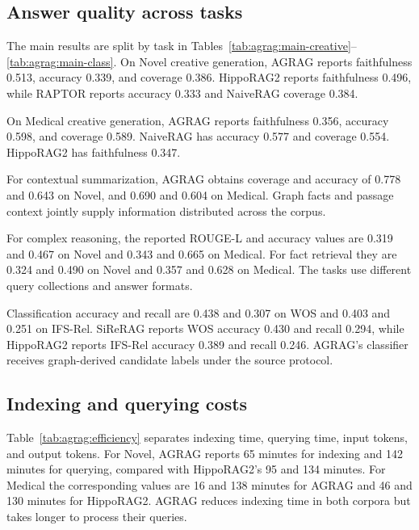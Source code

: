 





\subsection{Answer quality across tasks}
The main results are split by task in Tables~\ref{tab:agrag:main-creative}--\ref{tab:agrag:main-class}. On Novel creative generation, AGRAG reports faithfulness 0.513, accuracy 0.339, and coverage 0.386. HippoRAG2 reports faithfulness 0.496, while RAPTOR reports accuracy 0.333 and NaiveRAG coverage 0.384.

On Medical creative generation, AGRAG reports faithfulness 0.356, accuracy 0.598, and coverage 0.589. NaiveRAG has accuracy 0.577 and coverage 0.554. HippoRAG2 has faithfulness 0.347.

For contextual summarization, AGRAG obtains coverage and accuracy of 0.778 and 0.643 on Novel, and 0.690 and 0.604 on Medical. Graph facts and passage context jointly supply information distributed across the corpus.

For complex reasoning, the reported ROUGE-L and accuracy values are 0.319 and 0.467 on Novel and 0.343 and 0.665 on Medical. For fact retrieval they are 0.324 and 0.490 on Novel and 0.357 and 0.628 on Medical. The tasks use different query collections and answer formats.

Classification accuracy and recall are 0.438 and 0.307 on WOS and 0.403 and 0.251 on IFS-Rel. SiReRAG reports WOS accuracy 0.430 and recall 0.294, while HippoRAG2 reports IFS-Rel accuracy 0.389 and recall 0.246. AGRAG's classifier receives graph-derived candidate labels under the source protocol.

\subsection{Indexing and querying costs}

Table~\ref{tab:agrag:efficiency} separates indexing time, querying time, input tokens, and output tokens. For Novel, AGRAG reports 65 minutes for indexing and 142 minutes for querying, compared with HippoRAG2's 95 and 134 minutes. For Medical the corresponding values are 16 and 138 minutes for AGRAG and 46 and 130 minutes for HippoRAG2. AGRAG reduces indexing time in both corpora but takes longer to process their queries.


